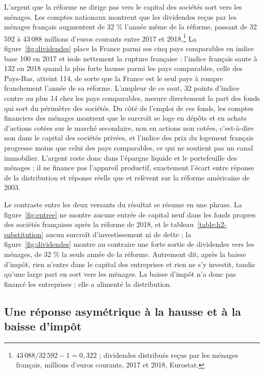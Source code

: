 L'argent que la réforme ne dirige pas vers le capital des sociétés sort vers les ménages. Les
comptes nationaux montrent que les dividendes reçus par les ménages français augmentent de 32 \%
l'année même de la réforme, passant de 32\,592 à 43\,088 millions d'euros courants entre 2017 et
2018.\footnote{$43\,088 / 32\,592 - 1 = 0{,}322$ ; dividendes distribués reçus par les ménages
français, millions d'euros courants, 2017 et 2018, Eurostat.} La figure~\ref{fig:dividendes} place
la France parmi ses cinq pays comparables en indice base 100 en 2017 et isole nettement la rupture française :
l'indice français saute à 132 en 2018 quand la plus forte hausse parmi les pays comparables, celle des Pays-Bas,
atteint 114, de sorte que la France est le seul pays à rompre franchement l'année de sa réforme.
L'ampleur de ce saut, 32 points d'indice contre au plus 14 chez les pays comparables, mesure directement la
part des fonds qui sort du périmètre des sociétés. Du côté de l'emploi de ces fonds, les comptes
financiers des ménages montrent que le surcroît se loge en dépôts et en achats d'actions cotées sur
le marché secondaire, non en actions non cotées, c'est-à-dire non dans le capital des sociétés
privées, et l'indice des prix du logement français progresse moins que celui des pays comparables, ce qui ne
soutient pas un canal immobilier. L'argent reste donc dans l'épargne liquide et le portefeuille des
ménages ; il ne finance pas l'appareil productif, exactement l'écart entre réponse de la
distribution et réponse réelle que \citet{chetty2005} et \citet{yagan2015} relèvent sur la réforme
américaine de 2003.

Le contraste entre les deux versants du résultat se résume en une phrase. La
figure~\ref{fig:entree} ne montre aucune entrée de capital neuf dans les fonds propres des sociétés
françaises après la réforme de 2018, et le tableau~\ref{table:h2-substitution} aucun surcroît
d'investissement ni de dette ; la figure~\ref{fig:dividendes} montre au contraire une forte sortie
de dividendes vers les ménages, de 32 \% la seule année de la réforme. Autrement dit, après la
baisse d'impôt, rien n'entre dans le capital des entreprises et rien ne s'y investit, tandis qu'une
large part en sort vers les ménages. La baisse d'impôt n'a donc pas financé les entreprises ; elle a
alimenté la distribution.

\subsection{Une réponse asymétrique à la hausse et à la baisse d'impôt}

